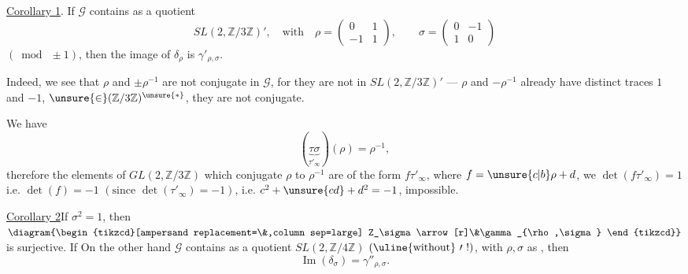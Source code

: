 \uline{Corollary 1}. If $\mathcal{G}$ contains as a quotient
\[
SL(2,\mathbb{Z}/3\mathbb{Z})',\quad\text{with}\quad
\rho=\begin{pmatrix}0&1\\-1&1\end{pmatrix},\qquad
\sigma=\begin{pmatrix}0&-1\\1&0\end{pmatrix}
\]
$(\bmod\ \pm1)$, then the image of $\delta_\rho$ is
$\gamma'_{\rho,\sigma}$.

Indeed, we see that $\rho$ and $\pm\rho^{-1}$ are not
conjugate in $\mathcal{G}$, for they are
not in $SL(2,\mathbb{Z}/3\mathbb{Z})'$ ---
$\rho$ and $-\rho^{-1}$ already have distinct traces
$1$ and $-1$, $\unsure{\in}(\mathbb{Z}/3\mathbb{Z})^{\unsure{*}}$,
they are not conjugate.

We have
\[
(\underbrace{\tau\sigma}_{\tau'_\infty})(\rho)=\rho^{-1},
\]
therefore
 the elements of
$GL(2,\mathbb{Z}/3\mathbb{Z})$
which conjugate $\rho$ to $\rho^{-1}$ are of the form
$f\tau'_\infty$, where
$f=\unsure{c|b}\rho+d$, we 
$\det(f\tau'_\infty)=1$ i.e. $\det(f)=-1$
$(\text{since }\det(\tau'_\infty)=-1)$,
i.e. $c^2+\unsure{cd}+d^2=-1$, impossible.



\uline{Corollary 2}\quad If $\sigma^2=1$, then
$\diagram{\begin{tikzcd}[ampersand replacement=\&,column sep=large]
Z_\sigma\arrow[r]\&\gamma_{\rho,\sigma}
\end{tikzcd}}$
is surjective. If On the other hand $\mathcal{G}$ contains as a quotient
$SL(2,\mathbb{Z}/4\mathbb{Z})$
$(\uline{\text{without}}\ \prime\ !)$, with $\rho,\sigma$ as
, then
\[
\operatorname{Im}(\delta_\sigma)=\gamma''_{\rho,\sigma}.
\]

